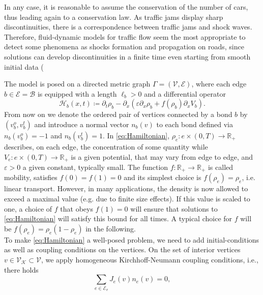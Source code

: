 In any case, it is reasonable to assume the conservation of the number of cars, thus leading again to a conservation law. As traffic jams display sharp discontinuities, there is a correspondence between traffic jams and shock waves. Therefore, fluid-dynamic models for traffic flow seem the most appropriate to detect some phenomena as shocks formation and propagation on roads, since solutions can develop discontinuities in a finite time even starting from smooth initial data (




The model is posed on a directed metric graph $\Gamma = (\mathcal{V}, \mathcal{E})$, where each edge $b \in \mathcal{E} = \mathcal{B}$ is equipped with a length $\ell_b > 0$ and a differential operator
\begin{equation} 
    \label{eq:Hamiltonian}
    \mathcal{H}_b(x,t) \coloneqq \partial_t \rho_b  - \partial_x (\varepsilon \partial_x \rho_b + f(\rho_b) \partial_x V_b).
\end{equation}
From now on we denote the ordered pair of vertices connected by a bond $b$ by $(v^{o}_b, v^{t}_b)$ and introduce a normal vector $n_b(v)$ to each bond defined via $n_b(v^{o}_b) = -1$ and $n_b(v^{t}_b) = 1$. In \cref{eq:Hamiltonian}, $\rho_e \colon e \times (0,T) \to \mathbb{R}_{+}$ describes, on each edge, the concentration of some quantity while $V_e \colon e \times (0,T) \to \mathbb{R}_{+}$ is a given potential, that may vary from edge to edge, and $\varepsilon > 0$ a given constant, typically small. The function $f \colon \mathbb{R}_{+} \to \mathbb{R}_{+}$ is called mobility, satisfies $f(0) = f(1) = 0$ and its simplest choice is $f(\rho_e) = \rho_e$, i.e. linear transport. However, in many applications, the density is now allowed to exceed a maximal value (e.g. due to finite size effects). If this value is scaled to one, a choice of $f$ that obeys $f(1) = 0$ will ensure that solutions to \eqref{eq:Hamiltonian} will satisfy this bound for all times. A typical choice for $f$ will be $f(\rho_e) = \rho_e(1-\rho_e)$ in the following. \\
To make \cref{eq:Hamiltonian} a well-posed problem, we need to add initial-conditions as well as coupling conditions on the vertices. On the set of interior vertices $v \in \mathcal{V}_\mathcal{K} \subset \mathcal{V}$, we apply homogeneous Kirchhoff-Neumann coupling conditions, i.e., there holds
\begin{equation}
    \label{eq:Kirchhoff_Neumann_condition}
    \sum_{e\in \mathcal{E}_v} J_e(v) n_e (v)=0,
\end{equation}

